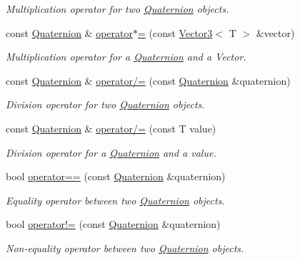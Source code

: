 \begin{DoxyCompactItemize}
\begin{DoxyCompactList}\small\item\em Multiplication operator for two \hyperlink{classsparky_1_1_quaternion}{Quaternion} objects. \end{DoxyCompactList}\item 
const \hyperlink{classsparky_1_1_quaternion}{Quaternion} \& \hyperlink{classsparky_1_1_quaternion_a88982ec49b38923914d36f8e57c1ac36}{operator$\ast$=} (const \hyperlink{classsparky_1_1_vector3}{Vector3}$<$ T $>$ \&vector)
\begin{DoxyCompactList}\small\item\em Multiplication operator for a \hyperlink{classsparky_1_1_quaternion}{Quaternion} and a Vector. \end{DoxyCompactList}\item 
const \hyperlink{classsparky_1_1_quaternion}{Quaternion} \& \hyperlink{classsparky_1_1_quaternion_a5cef5dcaf6bebcef9f794b1515117772}{operator/=} (const \hyperlink{classsparky_1_1_quaternion}{Quaternion} \&quaternion)
\begin{DoxyCompactList}\small\item\em Division operator for two \hyperlink{classsparky_1_1_quaternion}{Quaternion} objects. \end{DoxyCompactList}\item 
const \hyperlink{classsparky_1_1_quaternion}{Quaternion} \& \hyperlink{classsparky_1_1_quaternion_af40bb1d352e83dde0ce86f4b4753e0bf}{operator/=} (const T value)
\begin{DoxyCompactList}\small\item\em Division operator for a \hyperlink{classsparky_1_1_quaternion}{Quaternion} and a value. \end{DoxyCompactList}\item 
bool \hyperlink{classsparky_1_1_quaternion_af484847df55adb445322d4b74bea87b9}{operator==} (const \hyperlink{classsparky_1_1_quaternion}{Quaternion} \&quaternion)
\begin{DoxyCompactList}\small\item\em Equality operator between two \hyperlink{classsparky_1_1_quaternion}{Quaternion} objects. \end{DoxyCompactList}\item 
bool \hyperlink{classsparky_1_1_quaternion_a1d8bfb186bb2f6f07fde82a35ae4bc5e}{operator!=} (const \hyperlink{classsparky_1_1_quaternion}{Quaternion} \&quaternion)
\begin{DoxyCompactList}\small\item\em Non-\/equality operator between two \hyperlink{classsparky_1_1_quaternion}{Quaternion} objects. \end{DoxyCompactList}\item 

\end{DoxyCompactItemize}
